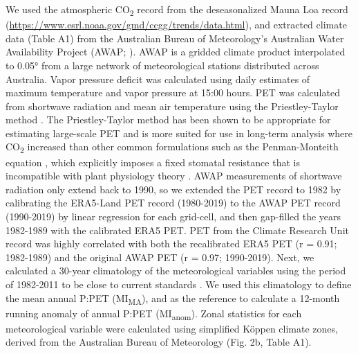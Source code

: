 \documentclass[gc, manuscript]{copernicus}
\begin{document}
We used the atmospheric CO\textsubscript{2} record from the
deseasonalized Mauna Loa record
(\url{https://www.esrl.noaa.gov/gmd/ccgg/trends/data.html}), and
extracted climate data (Table A1) from the Australian Bureau of
Meteorology's Australian Water Availability Project (AWAP;
\citet{jonesHighqualitySpatialClimate2009}). AWAP is a gridded climate
product interpolated to 0.05° from a large network of meteorological
stations distributed across Australia. Vapor pressure deficit was
calculated using daily estimates of maximum temperature and vapor
pressure at 15:00 hours. PET was calculated from shortwave radiation and
mean air temperature using the Priestley-Taylor method
\citep{davisSimpleProcessledAlgorithms2017}. The Priestley-Taylor method
has been shown to be appropriate for estimating large-scale PET
\citep{raupachEquilibriumEvaporationConvective2000} and is more suited
for use in long-term analysis where CO\textsubscript{2} increased than
other common formulations such as the Penman-Monteith equation
\citep{greveAridityIndexGlobal2019, milly_dunne16}, which explicitly
imposes a fixed stomatal resistance that is incompatible with plant
physiology theory \citep{medlyn_etal01}. AWAP measurements of shortwave
radiation only extend back to 1990, so we extended the PET record to
1982 by calibrating the ERA5-Land PET record (1980-2019) to the AWAP PET
record (1990-2019) by linear regression for each grid-cell, and then
gap-filled the years 1982-1989 with the calibrated ERA5 PET. PET from
the Climate Research Unit record \citep{harris_etal14} was highly
correlated with both the recalibrated ERA5 PET (r = 0.91; 1982-1989) and
the original AWAP PET (r = 0.97; 1990-2019). Next, we calculated a
30-year climatology of the meteorological variables using the period of
1982-2011 to be close to current standards
\citep{worldmeteorologicalorganizationWMOGuidelinesCalculation2017}. We
used this climatology to define the mean annual P:PET
(MI\textsubscript{MA}), and as the reference to calculate a 12-month
running anomaly of annual P:PET (MI\textsubscript{anom}). Zonal
statistics for each meteorological variable were calculated using
simplified Köppen climate zones, derived from the Australian Bureau of
Meteorology (Fig. 2b, Table A1).
\end{document}
